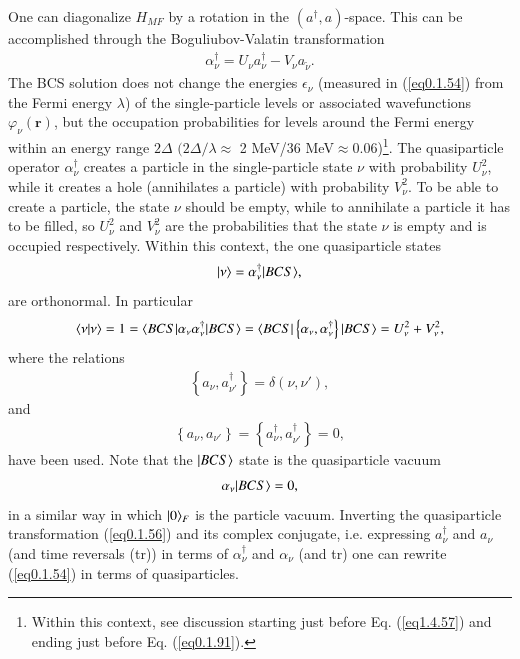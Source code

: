 One can diagonalize $H_{MF}$ by a rotation in the $(a^\dagger,a)$-space. This can be accomplished through the Boguliubov-Valatin transformation
\begin{align}\label{eq0.1.56}
\alpha^\dagger_\nu=U_\nu a^\dagger_\nu-V_\nu a_{\tilde\nu}.
\end{align}
The BCS solution does not change the energies $\epsilon_\nu$ (measured in (\ref{eq0.1.54}) from the Fermi energy $\lambda$) of the single-particle levels or associated wavefunctions $\varphi_{\nu}(\mathbf r)$, but the occupation probabilities for levels around the Fermi energy within an energy range $2\Delta$ $(2\Delta/\lambda\approx$ 2 MeV/36 MeV$\approx0.06$)\footnote{Within this context, see discussion starting just before Eq. (\ref{eq1.4.57}) and ending just before Eq. (\ref{eq0.1.91}).}. The quasiparticle operator $\alpha^\dagger_\nu$ creates a particle in the single-particle state $\nu$ with probability $U^2_\nu$, while it creates a hole (annihilates a particle) with probability $V^2_\nu$. To be able to create a particle, the state $\nu$ should be empty, while to annihilate a particle it has to be filled, so $U^2_\nu$ and $V^2_\nu$ are the probabilities  that the state $\nu$ is empty and is occupied respectively. Within this context, the one quasiparticle states   
\begin{align}\label{eq0.1.57}
|{\nu} \rangle=\alpha^\dagger_\nu|{BCS} \rangle,
\end{align}
are orthonormal. In particular
\begin{align}\label{eq0.1.58}
\langle {\nu|\nu} \rangle=1=\langle {BCS|\alpha_{\nu}\alpha^\dagger_\nu|BCS} \rangle=\langle {BCS|\left\{\alpha_{\nu},\alpha^\dagger_\nu\right\}|BCS} \rangle=U^2_\nu+V^2_\nu,
\end{align}
where the relations
\begin{align}\label{eq0.1.59}
\left\{a_{\nu},a^\dagger_{\nu'}\right\}=\delta(\nu,\nu'),
\end{align}
and
\begin{align}\label{eq0.1.60}
\left\{a_{\nu},a_{\nu'}\right\}=\left\{a^\dagger_{\nu},a^\dagger_{\nu'}\right\}=0,
\end{align}
have been used. Note that the $|{BCS} \rangle$ state is the quasiparticle vacuum
\begin{align}\label{eq0.1.61}
\alpha_\nu|{BCS} \rangle=0,
\end{align}
in a similar way in which $|{0} \rangle_F$ is the particle vacuum. Inverting the quasiparticle transformation (\ref{eq0.1.56}) and its complex conjugate, i.e. expressing $a_\nu^\dagger$ and $a_\nu$ (and time reversals (tr)) in terms of $\alpha^\dagger_\nu$ and $\alpha_\nu$ (and tr) one can rewrite (\ref{eq0.1.54}) in terms of quasiparticles.

